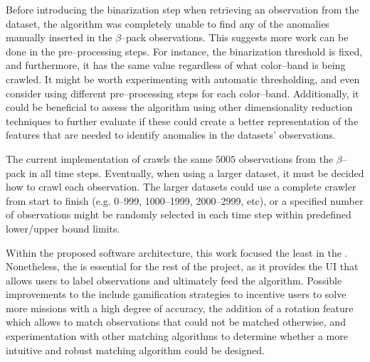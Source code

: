 Before introducing the binarization step when retrieving an observation from the dataset, the \mlblink algorithm was completely unable to find any of the anomalies manually inserted in the $\beta$--pack observations. This suggests more work can be done in the pre--processing steps. For instance, the binarization threshold is fixed, and furthermore, it has the same value regardless of what \panstarrs color--band is being crawled. It might be worth experimenting with automatic thresholding, and even consider using different pre--processing steps for each color--band. Additionally, it could be beneficial to assess the algorithm using other dimensionality reduction techniques to further evaluate if these could create a better representation of the features that are needed to identify anomalies in the datasets' observations. \newline

The current implementation of \mlblink crawls the same $5005$ observations from the $\beta$--pack in all time steps. Eventually, when using a larger dataset, it must be decided how to crawl each observation. The larger datasets could use a complete crawler from start to finish (e.g. 0--999, 1000--1999, 2000--2999, etc), or a specified number of observations might be randomly selected in each time step within predefined lower/upper bound limits. \newline

Within the proposed \vasco software architecture, this work focused the least in the \mlblinkui. Nonetheless, the \mlblinkui is essential for the rest of the project, as it provides the UI that allows users to label observations and ultimately feed the \mlblink algorithm. Possible improvements to the \mlblinkui include gamification strategies to incentive users to solve more missions with a high degree of accuracy, the addition of a rotation feature which allows to match observations that could not be matched otherwise, and experimentation with other matching algorithms to determine whether a more intuitive and robust matching algorithm could be designed. \newline

